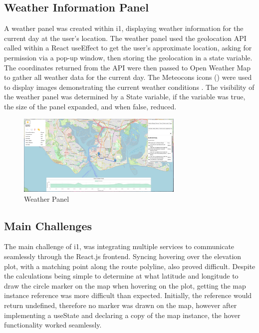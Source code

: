 \subsection{Weather Information Panel}
\label{iteration1:weather-panel}
A weather panel was created within i1, displaying weather information for the current day at the user's location. The weather panel used the geolocation API called within a React useEffect to get the user's approximate location, asking for permission via a pop-up window, then storing the geolocation in a state variable. The coordinates returned from the API were then passed to Open Weather Map to gather all weather data for the current day. The Meteocons icons (\cite{noauthor_weather_nodate}) were used to display images demonstrating the current weather conditions . The visibility of the weather panel was determined by a State variable, if the variable was true, the size of the panel expanded, and when false, reduced.

\begin{figure}[!ht]
    \centering
    \includegraphics[width=300px]{figures/Progress Images/Iteration-1/SR19&SR28 Combined/SR19&SR28 Merged.png}
    \caption{Weather Panel}
    \label{fig:basic-weather-panel}
\end{figure}

\subsection{Main Challenges}
\label{iteration1:main-challenges}
The main challenge of i1, was integrating multiple services to communicate seamlessly through the React.js frontend. Syncing hovering over the elevation plot, with a matching point along the route polyline, also proved difficult. Despite the calculations being simple to determine at what latitude and longitude to draw the circle marker on the map when hovering on the plot, getting the map instance reference was more difficult than expected. Initially, the reference would return undefined, therefore no marker was drawn on the map, however after implementing a useState and declaring a copy of the map instance, the hover functionality worked seamlessly.

